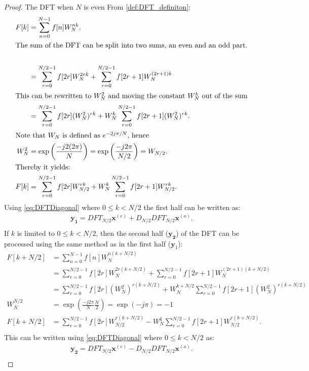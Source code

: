 \begin{proof}{The DFT when $N$ is even}
From \autoref{def:DFT_definiton}:
    \begin{align*}
         F[k]&=\sum^{N-1}_{n=0}f[n]W_N^{nk}.\\
        \intertext{The sum of the DFT can be split into two sums, an even and an odd part.}\\
        &=\sum^{N/2-1}_{r=0}f[2r]W_N^{2rk}+\sum^{N/2-1}_{r=0}f[2r+1]W_N^{(2r+1)k}\\
        \intertext{This can be rewritten to $W_N^2$ and moving the constant $W_N^k$ out of the sum}
        &=\sum^{N/2-1}_{r=0}f[2r](W_N^2)^{rk}+W_N^k\sum^{N/2-1}_{r=0}f[2r+1](W_N^2)^{rk}.\\
        \intertext{Note that $W_N$ is defined as $e^{-2j\pi/N}$, hence}
        W_N^2 &= \exp\left(\frac{-j2(2\pi)}{N}\right) = \exp\left(\frac{-j2\pi}{N/2}\right) = W_{N/2}.\\
        \intertext{Thereby it yields:}
        F[k] &= \sum^{N/2-1}_{r=0}f[2r]W^{rk}_{N/2}+W^k_N\sum^{N/2-1}_{r=0}f[2r+1]W^{rk}_{N/2}.\\
    \end{align*}
    Using \eqref{eq:DFTDiagonal} where $0 \leq k < N/2$ the first half can be written as:
     \begin{align*}
        \mathbf{y_1}=DFT_{N/2}\mathbf{x}^{(e)}+D_{N/2}DFT_{N/2}\mathbf{x}^{(o)}.\\ 
     \end{align*}
    If $k$ is limited to $0 \leq k < N/2$, then the second half ($\mathbf{y_2}$) of the DFT can be processed using the same method as in the first half ($\mathbf{y}_1$):
    \begin{align*}
        F[k+N/2] &= \sum^{N-1}_{n=0}f[n]W_N^{n(k+N/2)}\\
        &=\sum^{N/2-1}_{r=0}f[2r]W_N^{2r(k+N/2)}+\sum^{N/2-1}_{r=0}f[2r+1]W_N^{(2r+1)(k+N/2)}\\
        &=\sum^{N/2-1}_{r=0}f[2r](W_N^2)^{r(k+N/2)}+W_N^{k+N/2}\sum^{N/2-1}_{r=0}f[2r+1](W_N^2)^{r(k+N/2)}\\
        W_N^{N/2}&=\exp\left(\frac{-j2\pi}{N}\frac{N}{2}\right)=\exp\left(-j\pi\right)=-1\\
        F[k+N/2] &=\sum^{N/2-1}_{r=0}f[2r]W_{N/2}^{r(k+N/2)}-W_N^{k}\sum^{N/2-1}_{r=0}f[2r+1]W_{N/2}^{r(k+N/2)}.\\
    \end{align*}
    This can be written using \eqref{eq:DFTDiagonal} where $0 \leq k < N/2$ as:
    \begin{align*}
        \mathbf{y_2}=DFT_{N/2}\mathbf{x}^{(e)}-D_{N/2}DFT_{N/2}\mathbf{x}^{(o)}.\\ 
     \end{align*}
     \cite[67]{ryan2019linear}
\end{proof}
